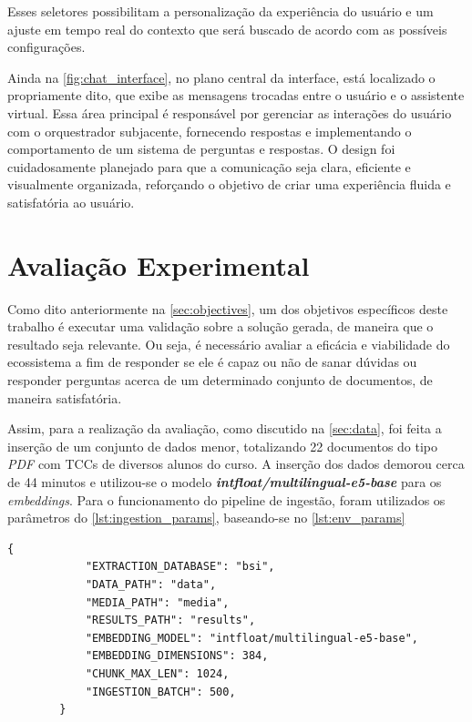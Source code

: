 \documentclass[a4paper, 12pt]{article}
\begin{document}
    Esses seletores possibilitam a personalização da experiência do usuário e um ajuste em tempo real do contexto que será buscado de acordo com as possíveis configurações.

    Ainda na \autoref{fig:chat_interface}, no plano central da interface, está localizado o  propriamente dito, que exibe as mensagens trocadas entre o usuário e o assistente virtual. Essa área principal é responsável por gerenciar as interações do usuário com o orquestrador subjacente, fornecendo respostas e implementando o comportamento de um sistema de perguntas e respostas. O design foi cuidadosamente planejado para que a comunicação seja clara, eficiente e visualmente organizada, reforçando o objetivo de criar uma experiência fluida e satisfatória ao usuário.

    \clearpage

    \section{Avaliação Experimental} \label{sec:experiment}

    Como dito anteriormente na \autoref{sec:objectives}, um dos objetivos específicos deste trabalho é executar uma validação sobre a solução gerada, de maneira que o resultado seja relevante. Ou seja, é necessário avaliar a eficácia e viabilidade do ecossistema a fim de responder se ele é capaz ou não de sanar dúvidas ou responder perguntas acerca de um determinado conjunto de documentos, de maneira satisfatória. 

    Assim, para a realização da avaliação, como discutido na \autoref{sec:data}, foi feita a inserção de um conjunto de dados menor, totalizando 22 documentos do tipo \textit{PDF} com TCCs de diversos alunos do curso. A inserção dos dados demorou cerca de 44 minutos e utilizou-se o modelo \textit{\textbf{intfloat/multilingual-e5-base}} para os \textit{embeddings}. Para o funcionamento do pipeline de ingestão, foram utilizados os parâmetros do \autoref{lst:ingestion_params}, baseando-se no \autoref{lst:env_params}

    \begin{lstlisting}[caption={Objeto com os parâmetros da configuração de ambiente do pipeline de ingestão.}, label={lst:ingestion_params}]
        {
            "EXTRACTION_DATABASE": "bsi",
            "DATA_PATH": "data",
            "MEDIA_PATH": "media",
            "RESULTS_PATH": "results",
            "EMBEDDING_MODEL": "intfloat/multilingual-e5-base",
            "EMBEDDING_DIMENSIONS": 384,
            "CHUNK_MAX_LEN": 1024,
            "INGESTION_BATCH": 500,
        }
    \end{lstlisting}
\end{document}
